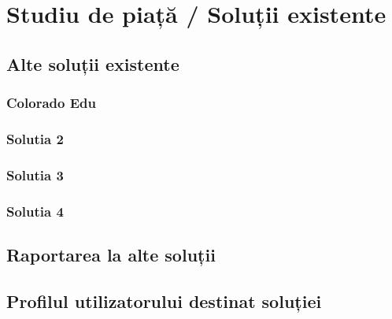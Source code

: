 \chapter{Studiu de piață / Soluții existente}
\label{chapter:studiuPiata}

\section{Alte soluții existente}
\label{sec:proj}
\subsection{Colorado Edu}
\subsection{Solutia 2}
\subsection{Solutia 3}
\subsection{Solutia 4}

\section{Raportarea la alte soluții}
\label{sub-sec:proj-scope}

\section{Profilul utilizatorului destinat soluției}
\label{sub-sec:proj-user-profile}


